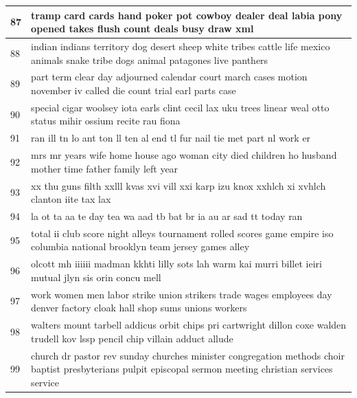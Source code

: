 \documentclass[letterpaper,11pt]{report}
\begin{document}
\begin{longtable}[c]{| p{1cm} | p{16cm} |}
87 & tramp card cards hand poker pot cowboy dealer deal labia pony opened takes flush count deals busy draw xml                                                       \\ \hline
88 & indian indians territory dog desert sheep white tribes cattle life mexico animals snake tribe dogs animal patagones live panthers                                \\ \hline
89 & part term clear day adjourned calendar court march cases motion november iv called die count trial earl parts case                                               \\ \hline
90 & special cigar woolsey iota earls clint cecil lax uku trees linear weal otto status mihir ossium recite rau fiona                                                 \\ \hline
91 & ran ill tn lo ant ton ll ten al end tl fur nail tie met part nl work er                                                                                          \\ \hline
92 & mrs mr years wife home house ago woman city died children ho husband mother time father family left year                                                         \\ \hline
93 & xx thu guns filth xxlll kvas xvi vill xxi karp izu knox xxhlch xi xvhlch clanton iite tax lax                                                                    \\ \hline
94 & la ot ta aa te day tea wa aad tb bat br ia au ar sad tt today ran                                                                                                \\ \hline
95 & total ii club score night alleys tournament rolled scores game empire iso columbia national brooklyn team jersey games alley                                     \\ \hline
96 & olcott mh iiiiii madman kkhti lilly sots lah warm kai murri billet ieiri mutual jlyn sis orin concu mell                                                         \\ \hline
97 & work women men labor strike union strikers trade wages employees day denver factory cloak hall shop sums unions workers                                          \\ \hline
98 & walters mount tarbell addicus orbit chips pri cartwright dillon coxe walden trudell kov lssp pencil chip villain adduct allude                                   \\ \hline
99 & church dr pastor rev sunday churches minister congregation methods choir baptist presbyterians pulpit episcopal sermon meeting christian services service        \\ \hline
 
 \end{longtable}
\end{document}
